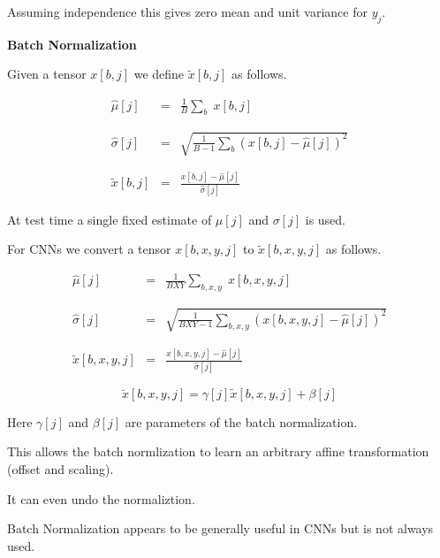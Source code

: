 {\vfill
Assuming independence this gives zero mean and unit variance for $y_j$.

\slide{}
\centerline{\bf Batch Normalization}
\vfill

Given a tensor $x[b,j]$ we define $\tilde{x}[b,j]$ as follows.

\begin{eqnarray*}
  \hat{\mu}[j] & = & \frac{1}{B} \sum_b\;x[b,j] \\
  \\
  \\
  \hat{\sigma}[j] & = & \sqrt{\frac{1}{B-1} \sum_b (x[b,j]-\hat{\mu}[j])^2} \\
  \\
  \\
  \tilde{x}[b,j]& = & \frac{x[b,j] - \hat{\mu}[j]}{\hat{\sigma}[j]}
\end{eqnarray*}


\vfill
At test time a single fixed estimate of $\mu[j]$ and $\sigma[j]$ is used.


For CNNs we convert a tensor $x[b,x,y,j]$ to $\tilde{x}[b,x,y,j]$ as follows.

\begin{eqnarray*}
  \hat{\mu}[j] & = & \frac{1}{BXY} \sum_{b,x,y}\;x[b,x,y,j] \\
  \\
  \\
  \hat{\sigma}[j] & = & \sqrt{\frac{1}{BXY-1} \sum_{b,x,y} (x[b,x,y,j]-\hat{\mu}[j])^2} \\
  \\
  \\
  \tilde{x}[b,x,y,j]& = & \frac{x[b,x,y,j] - \hat{\mu}[j]}{\hat{\sigma}[j]}
\end{eqnarray*}


$$\breve{x}[b,x,y,j] = \gamma[j] \tilde{x}[b,x,y,j] + \beta[j]$$

\vfill
Here $\gamma[j]$ and $\beta[j]$ are parameters of the batch normalization.

\vfill
This allows the batch normlization to learn an arbitrary affine transformation (offset and scaling).

\vfill
It can even undo the normaliztion.


Batch Normalization appears to be generally useful in CNNs but is not always used.

}
